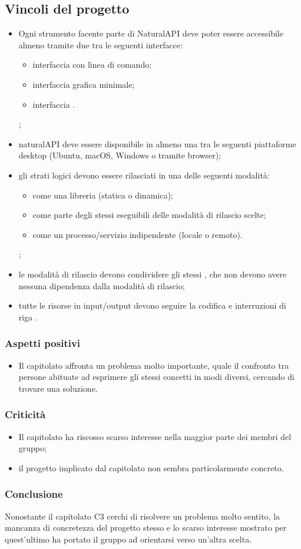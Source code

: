   \subsection{Vincoli del progetto}
   	\begin{itemize}
   		\item Ogni strumento facente parte di NaturalAPI deve poter essere accessibile almeno tramite due tra le seguenti interfacce:
   			\begin{itemize}
   				\item interfaccia con linea di comando;
   				\item interfaccia grafica minimale;
   				\item interfaccia .
   			\end{itemize};
   			\item naturalAPI deve essere disponibile in almeno una tra le seguenti piattaforme desktop (Ubuntu, macOS, Windows o tramite browser);
   			\item gli strati logici devono essere rilasciati in una delle seguenti modalità:
   				\begin{itemize}
   					\item come una libreria (statica o dinamica);
   					\item come parte degli stessi eseguibili delle modalità di rilascio scelte;
   					\item come un processo/servizio indipendente (locale o remoto).
   				\end{itemize};
   			\item le modalità di rilascio devono condividere gli stessi , che non devono avere nessuna dipendenza dalla modalità di rilascio;
   			\item tutte le risorse in input/output devono seguire la codifica  e interruzioni di riga .
   	\end{itemize}

    \subsubsection{Aspetti positivi}
    \begin{itemize}
      \item Il capitolato affronta un problema molto importante, quale il confronto tra persone abituate ad esprimere gli stessi concetti in modi diversi, cercando di trovare una soluzione.
    \end{itemize}
    \subsubsection{Criticità}
    \begin{itemize}
    		\item Il capitolato ha riscosso scarso interesse nella maggior parte dei membri del gruppo;
    		\item il progetto implicato dal capitolato non sembra particolarmente concreto.
    \end{itemize}
    \subsubsection{Conclusione}
    Nonostante il capitolato C3 cerchi di risolvere un problema molto sentito, la mancanza di concretezza del progetto stesso e lo scarso interesse mostrato per quest'ultimo ha portato il gruppo ad orientarsi verso un'altra scelta.
